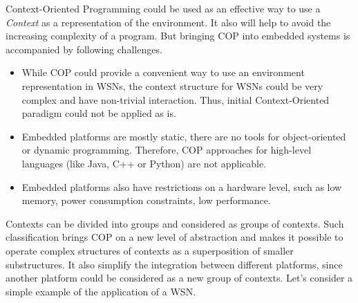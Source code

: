\documentclass{ubicomp-ext}
\begin{document}
Context-Oriented Programming could be used as an effective way to use a \textit{Context} as a representation of the environment. It also will help to avoid the increasing complexity of a program. But bringing COP into embedded systems is accompanied by following challenges.
\begin{itemize}\compresslist
\item
While COP could provide a convenient way to use an environment representation in WSNs, the context structure for WSNs could be very complex and have non-trivial interaction. Thus, initial Context-Oriented paradigm could not be applied as is.
\item
Embedded platforms are mostly static, there are no tools for object-oriented or dynamic programming. Therefore, COP approaches for high-level languages (like Java, C++ or Python) are not applicable. 
\item
Embedded platforms also have restrictions on a hardware level, such as low memory, power consumption constraints, low performance.
\end{itemize}
Contexts can be divided into groups and considered as groups of contexts. Such classification brings COP on a new level of abstraction and makes it possible to operate complex structures of contexts as a superposition of smaller substructures. It also simplify the integration between different platforms, since another platform could be considered as a new group of contexts. Let's consider a simple example of the application of a WSN. 
\end{document}
